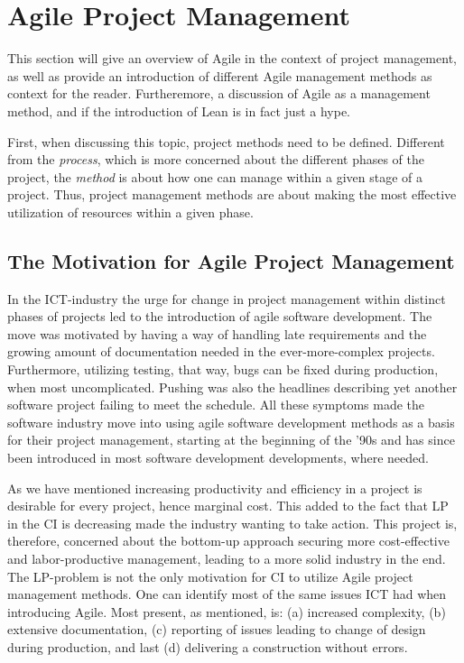\section{Agile Project Management}
This section will give an overview of Agile in the context of project management, as well as provide an introduction of different Agile management methods as context for the reader. Furtheremore, a discussion of Agile as a management method, and if the introduction of Lean is in fact just a hype. 

First, when discussing this topic, project methods need to be defined. Different from the \textit{process}, which is more concerned about the different phases of the project, the \textit{method} is about how one can manage within a given stage of a project. Thus, project management methods are about making the most effective utilization of resources within a given phase. 

\subsection{The Motivation for Agile Project Management}
In the ICT-industry the urge for change in project management within distinct phases of projects led to the introduction of agile software development. The move was motivated by having a way of handling late requirements and the growing amount of documentation needed in the ever-more-complex projects. Furthermore, utilizing testing, that way, bugs can be fixed during production, when most uncomplicated. Pushing was also the headlines describing yet another software project failing to meet the schedule. All these symptoms made the software industry move into using agile software development methods as a basis for their project management, starting at the beginning of the '90s and has since been introduced in most software development developments, where needed.  

As we have mentioned increasing productivity and efficiency in a project is desirable for every project, hence marginal cost. This added to the fact that LP in the CI is decreasing made the industry wanting to take action. This project is, therefore, concerned about the bottom-up approach securing more cost-effective and labor-productive management, leading to a more solid industry in the end. The LP-problem is not the only motivation for CI to utilize Agile project management methods. One can identify most of the same issues ICT had when introducing Agile. Most present, as mentioned, is: (a) increased complexity, (b) extensive documentation, (c) reporting of issues leading to change of design during production, and last (d) delivering a construction without errors.

